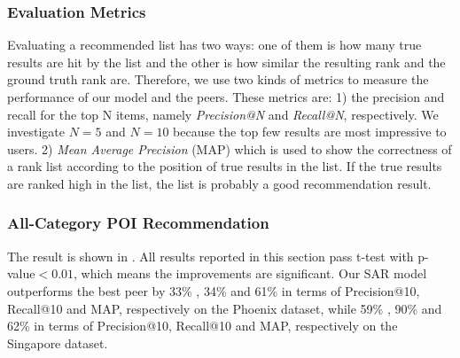 \subsubsection{Evaluation Metrics}
Evaluating a recommended list has two ways: one of
them is how many true results are hit by the list and the other is
how similar the resulting rank and the ground truth rank are.
Therefore, we use two kinds of metrics to measure the performance of our model
and the peers. These metrics are: 1) the precision and recall for
the top N items, namely \emph{Precision@N} and \emph{Recall@N}, respectively.
We investigate
$N=5$ and $N=10$ because the top few results are most impressive
to users. %
2) \emph{Mean Average Precision} (MAP)
which is used to show the correctness of a rank list according
to the position of true results in the list.
If the true results are ranked high in the list, the list is probably
a good recommendation result.


\subsubsection{All-Category POI Recommendation}
The result
is shown in .
All results reported in this section pass t-test with
p-value$<0.01$, which means the improvements are significant.
Our SAR model outperforms
the best peer by 33\% , 34\% and 61\% in terms of
Precision@10, Recall@10 and MAP, respectively
on the Phoenix dataset, while 59\% ,
90\% and 62\% in terms of
Precision@10, Recall@10 and MAP, respectively
on the Singapore dataset.

